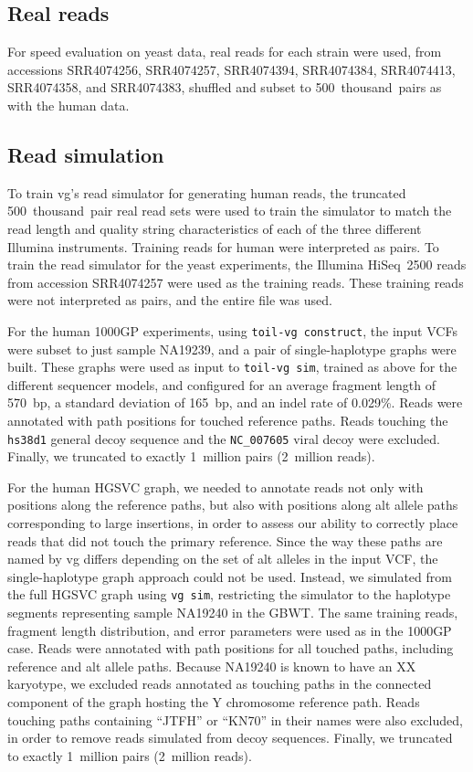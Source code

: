 \documentclass[11pt]{ucscthesis}
\begin{document}
\subsection{Real reads}

For speed evaluation on yeast data, real reads for each strain were used, from accessions SRR4074256, SRR4074257, SRR4074394, SRR4074384, SRR4074413, SRR4074358, and SRR4074383, shuffled and subset to 500~thousand~pairs as with the human data.


\subsection{Read simulation}
\label{subsec:aim2:readsim}

To train vg's read simulator for generating human reads, the truncated 500~thousand~pair real read sets were used to train the simulator to match the read length and quality string characteristics of each of the three different Illumina instruments.
Training reads for human were interpreted as pairs.
To train the read simulator for the yeast experiments, the Illumina HiSeq~2500 reads from accession SRR4074257 were used as the training reads.
These training reads were not interpreted as pairs, and the entire file was used.


For the human 1000GP experiments, using \texttt{toil-vg~construct}, the input VCFs were subset to just sample NA19239, and a pair of single-haplotype graphs were built.
These graphs were used as input to \texttt{toil-vg~sim}, trained as above for the different sequencer models, and configured for an average fragment length of 570~bp, a standard deviation of 165~bp, and an indel rate of 0.029\%.
Reads were annotated with path positions for touched reference paths.
Reads touching the \texttt{hs38d1} general decoy sequence and the \texttt{NC\_007605} viral decoy were excluded.
Finally, we truncated to exactly 1~million pairs (2~million reads).

For the human HGSVC graph, we needed to annotate reads not only with positions along the reference paths, but also with positions along alt allele paths corresponding to large insertions, in order to assess our ability to correctly place reads that did not touch the primary reference.
Since the way these paths are named by vg differs depending on the set of alt alleles in the input VCF, the single-haplotype graph approach could not be used.
Instead, we simulated from the full HGSVC graph using \texttt{vg~sim}, restricting the simulator to the haplotype segments representing sample NA19240 in the GBWT.
The same training reads, fragment length distribution, and error parameters were used as in the 1000GP case.
Reads were annotated with path positions for all touched paths, including reference and alt allele paths.
Because NA19240 is known to have an XX karyotype, we excluded reads annotated as touching paths in the connected component of the graph hosting the Y chromosome reference path.
Reads touching paths containing ``JTFH'' or ``KN70'' in their names were also excluded, in order to remove reads simulated from decoy sequences.
Finally, we truncated to exactly 1~million pairs (2~million reads).
\end{document}
